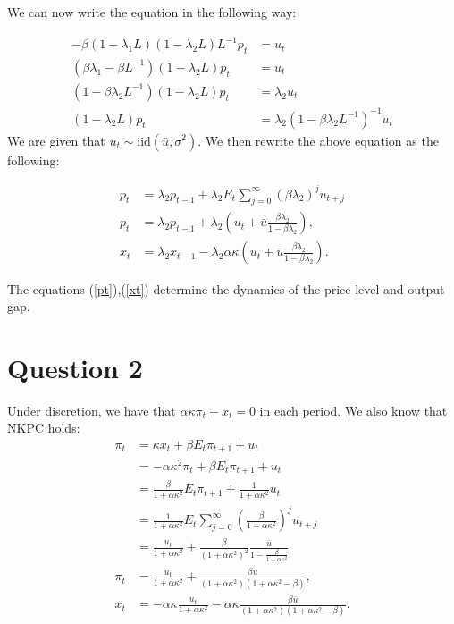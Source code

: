 \documentclass[11pt]{article} %
\begin{document}
We can now write the equation in the following way:

\begin{align*}
-\beta(1-\lambda_1L)(1-\lambda_2L)L^{-1}p_t &= u_t \\ %
(\beta\lambda_1 - \beta L^{-1})(1-\lambda_2L)p_t &= u_t \\
(1-\beta\lambda_2L^{-1})(1-\lambda_2L)p_t &= \lambda_2 u_t\\
(1-\lambda_2L)p_t &= \lambda_2 (1-\beta\lambda_2L^{-1})^{-1}u_t
\end{align*}
We are given that $u_t\sim \text{iid}(\bar{u},\sigma^2)$. We then rewrite the above equation as the following:

\begin{align}
p_t &= \lambda_2 p_{t-1} + \lambda_2 E_{t}\sum_{j=0}^{\infty}(\beta\lambda_2)^ju_{t+j} \nonumber \\
p_t &=\lambda_2 p_{t-1} +\lambda_2\left(u_t + \bar{u}\frac{\beta\lambda_2}{1-\beta\lambda_2}\right), \label{pt} \\
x_t &= \lambda_2 x_{t-1} - \lambda_2 \alpha \kappa \left(u_t + \bar{u}\frac{\beta\lambda_2}{1-\beta\lambda_2}\right). \label{xt}
\end{align}

The equations (\ref{pt}),(\ref{xt}) determine the dynamics of the price level and output gap.
\section{Question 2}
Under discretion, we have that $\alpha \kappa \pi_t + x_t = 0$ in each period. We also know that NKPC holds:
\begin{align*}
\pi_t &= \kappa x_t + \beta E_t \pi_{t+1} + u_t\\
&= -\alpha\kappa^2 \pi_t + \beta E_t \pi_{t+1} + u_t\\
&=  \frac{\beta}{1+\alpha\kappa^2} E_t \pi_{t+1} + \frac{1}{1+\alpha\kappa^2}u_t \\
&= \frac{1}{1+\alpha \kappa^2}E_t\sum_{j=0}^{\infty} \left( \frac{\beta}{1+\alpha\kappa^2} \right)^{j} u_{t+j}\\
&= \frac{u_t}{1+\alpha\kappa^2} +  \frac{\beta}{(1+\alpha\kappa^2)^2} \frac{\bar{u}}{1- \frac{\beta}{1+\alpha\kappa^2}}\\
\pi_t &= \frac{u_t}{1+\alpha\kappa^2} + \frac{\beta\bar{u}}{(1+\alpha\kappa^2)(1+\alpha\kappa^2 - \beta)},\\
x_t &= -\alpha \kappa \frac{u_t}{1+\alpha\kappa^2} - \alpha \kappa \frac{\beta\bar{u}}{(1+\alpha\kappa^2)(1+\alpha\kappa^2 - \beta)}.
\end{align*}
\end{document}
